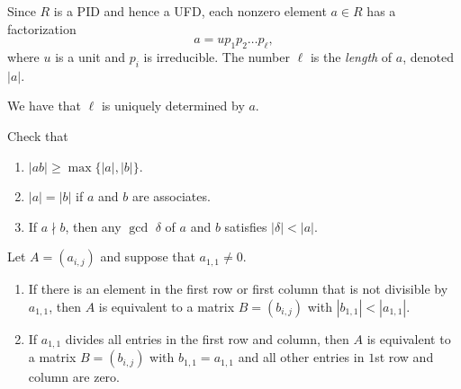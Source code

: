 \begin{definition}
  Since $R$ is a PID and hence a UFD, each nonzero
  element $a \in R$ has a factorization
  \[
    a = u p_1 p_2 \dots p_\ell,
  \]
  where $u$ is a unit and $p_i$ is irreducible. The
  number $\ell$ is the \emph{length} of $a$, denoted
  $|a|$.
\end{definition}

\begin{remark}
  We have that $\ell$ is uniquely determined by $a$.
\end{remark}

\begin{exercise}
  Check that
  \begin{enumerate}
    \item $|ab| \ge \max\{|a|, |b|\}$.
    \item $|a| = |b|$ if $a$ and $b$ are associates.
    \item If $a {\nmid} b$, then any $\gcd$ $\delta$ of
      $a$ and $b$ satisfies $|\delta| < |a|$.
  \end{enumerate}
\end{exercise}

\begin{lemma}
  Let $A = (a_{i, j})$ and suppose that $a_{1, 1} \ne 0$.
  \begin{enumerate}
    \item If there is an element in the first row or
      first column that is not divisible by $a_{1, 1}$,
      then $A$ is equivalent to a matrix $B = (b_{i, j})$
      with $|b_{1, 1}| < |a_{1, 1}|$.
    \item If $a_{1, 1}$ divides all entries in the first
      row and column, then $A$ is equivalent to a matrix
      $B = (b_{i, j})$ with $b_{1, 1} = a_{1, 1}$ and
      all other entries in $1$st row and column are zero.
  \end{enumerate}
\end{lemma}


